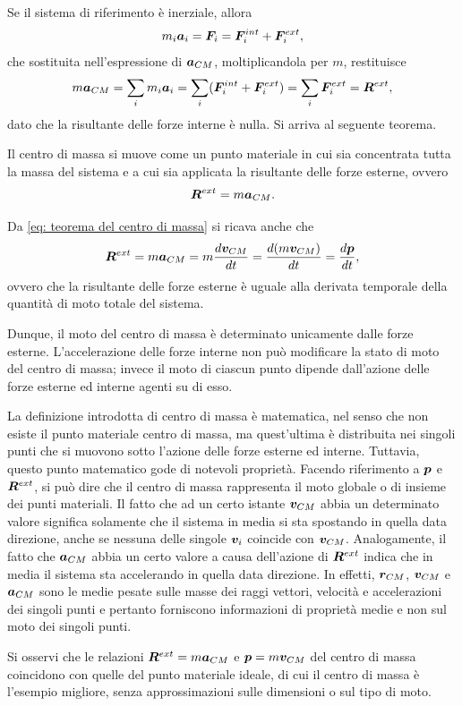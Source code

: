 Se il sistema di riferimento è inerziale, allora 
\begin{equation}
    m_i\bm{a}_i=\bm{F}_i=\bm{F}_i^{int}+\bm{F}_i^{ext},
\end{equation}
che sostituita nell'espressione di $\bm{a}_{CM}$, moltiplicandola per $m$, restituisce
\begin{equation}
    m\bm{a}_{CM}=\sum_im_i\bm{a}_i=\sum_i(\bm{F}_i^{int}+\bm{F}_i^{ext})=\sum_i\bm{F}_i^{ext}=\bm{R}^{ext},
\end{equation}
dato che la risultante delle forze interne è nulla. Si arriva al seguente teorema.
\begin{teo}
    Il centro di massa si muove come un punto materiale in cui sia concentrata tutta la massa del sistema e a cui sia applicata la risultante delle forze esterne, ovvero
    \begin{equation}
    \label{eq: teorema del centro di massa}
        \bm{R}^{ext}=m\bm{a}_{CM}.
    \end{equation}
\end{teo}
Da \eqref{eq: teorema del centro di massa} si ricava anche che
\begin{equation}
    \bm{R}^{ext}=m\bm{a}_{CM}=m\frac{d\bm{v}_{CM}}{dt}=\frac{d(m\bm{v}_{CM})}{dt}=\frac{d\bm{p}}{dt},
\end{equation}
ovvero che la risultante delle forze esterne è uguale alla derivata temporale della quantità di moto totale del sistema. 

Dunque, il moto del centro di massa è determinato unicamente dalle forze esterne. L'accelerazione delle forze interne non può modificare la stato di moto del centro di massa; invece il moto di ciascun punto dipende dall'azione delle forze esterne ed interne agenti su di esso.

La definizione introdotta di centro di massa è matematica, nel senso che non esiste il punto materiale centro di massa, ma quest'ultima è distribuita nei singoli punti che si muovono sotto l'azione delle forze esterne ed interne. Tuttavia, questo punto matematico gode di notevoli proprietà. Facendo riferimento a $\bm{p}$ e $\bm{R}^{ext}$, si può dire che il centro di massa rappresenta il moto globale o di insieme dei punti materiali. Il fatto che ad un certo istante $\bm{v}_{CM}$ abbia un determinato valore significa solamente che il sistema in media si sta spostando in quella data direzione, anche se nessuna delle singole $\bm{v}_i$ coincide con $\bm{v}_{CM}$. Analogamente, il fatto che $\bm{a}_{CM}$ abbia un certo valore a causa dell'azione di $\bm{R}^{ext}$ indica che in media il sistema sta accelerando in quella data direzione. In effetti, $\bm{r}_{CM}$, $\bm{v}_{CM}$ e $\bm{a}_{CM}$ sono le medie pesate sulle masse dei raggi vettori, velocità e accelerazioni dei singoli punti e pertanto forniscono informazioni di proprietà medie e non sul moto dei singoli punti. 
\begin{obs}
    Si osservi che le relazioni $\bm{R}^{ext}=m\bm{a}_{CM}$ e $\bm{p}=m\bm{v}_{CM}$ del centro di massa coincidono con quelle del punto materiale ideale, di cui il centro di massa è l'esempio migliore, senza approssimazioni sulle dimensioni o sul tipo di moto.
\end{obs}

